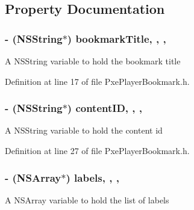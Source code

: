 \subsection{Property Documentation}
\hypertarget{interface_pxe_player_bookmark_ac56c6dc4c71c9ef3010afe5b81a81cb3}{
\subsubsection[{bookmark\-Title}]{\setlength{\rightskip}{0pt plus 5cm}-\/ (N\-S\-String$\ast$) bookmark\-Title\hspace{0.3cm}{\ttfamily [read]}, {\ttfamily [write]}, {\ttfamily [nonatomic]}, {\ttfamily [strong]}}}\label{interface_pxe_player_bookmark_ac56c6dc4c71c9ef3010afe5b81a81cb3}
A N\-S\-String variable to hold the bookmark title 

Definition at line 17 of file Pxe\-Player\-Bookmark.\-h.

\hypertarget{interface_pxe_player_bookmark_ae4b45f207dd31a597e765f7d53fd13e7}{
\subsubsection[{content\-I\-D}]{\setlength{\rightskip}{0pt plus 5cm}-\/ (N\-S\-String$\ast$) content\-I\-D\hspace{0.3cm}{\ttfamily [read]}, {\ttfamily [write]}, {\ttfamily [nonatomic]}, {\ttfamily [strong]}}}\label{interface_pxe_player_bookmark_ae4b45f207dd31a597e765f7d53fd13e7}
A N\-S\-String variable to hold the content id 

Definition at line 27 of file Pxe\-Player\-Bookmark.\-h.

\hypertarget{interface_pxe_player_bookmark_a4c5726238745b908389f27e7c04e1330}{
\subsubsection[{labels}]{\setlength{\rightskip}{0pt plus 5cm}-\/ (N\-S\-Array$\ast$) labels\hspace{0.3cm}{\ttfamily [read]}, {\ttfamily [write]}, {\ttfamily [nonatomic]}, {\ttfamily [strong]}}}\label{interface_pxe_player_bookmark_a4c5726238745b908389f27e7c04e1330}
A N\-S\-Array variable to hold the list of labels 

